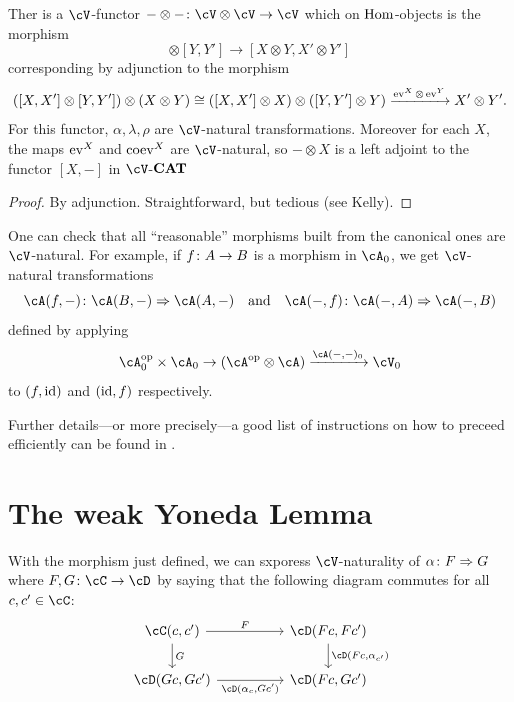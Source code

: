 \documentclass[a4paper,11pt,oneside,openany]{scrbook}
\begin{document}
\begin{prop}
	Ther is a $ \cV $-functor $ -\otimes -\from \cV \otimes \cV \to \cV $ which on $ \operatorname{\text{Hom}} $-objects is the morphism
	\begin{displaymath}
		[X,X']\otimes [Y,Y'] \to [X\otimes Y , X'\otimes Y']
	\end{displaymath}
	corresponding by adjunction to the morphism
	\begin{displaymath}
		([X,X']\otimes[Y,Y']) \otimes (X\otimes Y)\cong ([X,X']\otimes X)\otimes ([Y,Y']\otimes Y) \xrightarrow{\operatorname{ev}^X \otimes \operatorname{ev}^Y} X'\otimes Y'.
	\end{displaymath}
	For this functor, $ \alpha,\lambda,\rho $ are $ \cV $-natural transformations. Moreover for each $ X $, the maps $ \operatorname{ev}^X $ and $ \operatorname{coev}^X $ are $ \cV $-natural, so $ -\otimes X $ is a left adjoint to the functor $ [X,-] $ in $ \cV $-${\normalfont\textbf{CAT}}$
\end{prop}
\begin{proof}
	By adjunction. Straightforward, but tedious (see Kelly).
\end{proof}
\begin{rmk}
	One can check that all ``reasonable'' morphisms built from the canonical ones are $ \cV $-natural.
	For example, if $ f \colon A \to B $ is a morphism in $ \cA_0 $, we get $ \cV $-natural transformations
	\begin{displaymath}
		\cA(f,-) \from \cA(B,-)\Rightarrow \cA(A,-) \quad \text{and} \quad  \cA(-,f) \from \cA(-,A) \Rightarrow \cA(-,B)
	\end{displaymath}defined by applying
	\begin{displaymath}
		\cA_0^{\op}\times \cA_0 \to (\cA^{\op} \otimes \cA) \xrightarrow{\cA(-,-)_0} \cV_0
	\end{displaymath}
	to $ (f,\operatorname{id}) $ and $ (\operatorname{id},f) $ respectively.

	Further details---or more precisely---a good list of instructions on how to preceed efficiently can be found in \cite[\S 1.7 and 1.8]{Kelly}.
\end{rmk}


\section{The weak Yoneda Lemma}

\begin{rmk}
	With the morphism just defined, we can sxporess $ \cV $-naturality of $ \alpha \colon F \Rightarrow G $ where $ F,G\from \cC \to \cD $ by saying that the following diagram commutes for all $ c,c' \in \cC $:
	\begin{displaymath}
		\begin{tikzcd}[column sep = huge]
			\cC(c,c') \arrow[r, "F"]\arrow[d, "G"]& \cD(Fc, Fc')\arrow[d, "{\cD(Fc,\alpha_{c'})}"] \\
			\cD(Gc,Gc') \arrow[r, "{\cD(\alpha_c, Gc')}"' ]& \cD(Fc,Gc')
		\end{tikzcd}
	\end{displaymath}
\end{rmk}
\end{document}
